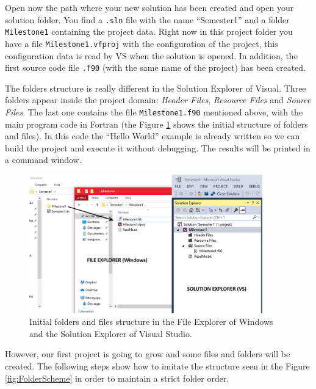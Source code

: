 Open now the path where your new solution has been created and open your solution folder. You find a \texttt{.sln} file with the name ``Semester1'' and a folder \texttt{Milestone1} containing the project data. Right now in this project folder you have a file \texttt{Milestone1.vfproj} with the configuration of the project, this configuration data is read by VS when the solution is opened. In addition, the first source code file \texttt{.f90} (with the same name of the project) has been created.

The folders structure is really different in the Solution Explorer of Visual. Three folders appear inside the project domain: \textit{Header Files}, \textit{Resource Files} and \textit{Source Files}. The last one contains the file \texttt{Milestone1.f90} mentioned above, with the main program code in Fortran (the Figure \ref{fig:Intro2} shows the initial structure of folders and files). In this code the ``Hello World'' example is already written so we can build the project and execute it without debugging. The results will be printed in a command window. 

\begin{figure}
    \centering
    \includegraphics[width= 0.9\textwidth]{Figures/Intro2}
    \caption{Initial folders and files structure in the File Explorer of Windows and the Solution Explorer of Visual Studio.}
    \label{fig:Intro2}
\end{figure}

However, our first project is going to grow and some files and folders will be created. The following steps show how to imitate the structure seen in the Figure \ref{fig:FolderScheme} in order to maintain a strict folder order. 

